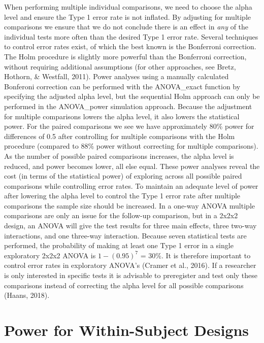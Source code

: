 \documentclass[,man,floatsintext]{apa6}
\begin{document}
When performing multiple individual comparisons, we need to choose the alpha level and ensure the Type 1 error rate is not inflated.
By adjusting for multiple comparisons we ensure that we do not conclude there is an effect in \emph{any} of the individual tests more often than the desired Type 1 error rate.
Several techniques to control error rates exist, of which the best known is the Bonferroni correction.
The Holm procedure is slightly more powerful than the Bonferroni correction, without requiring additional assumptions (for other approaches, see Bretz, Hothorn, \& Westfall, 2011).
Power analyses using a manually calculated Bonferoni correction can be performed with the ANOVA\_exact function by specifying the adjusted alpha level, but the sequential Holm approach can only be performed in the ANOVA\_power simulation approach.
Because the adjustment for multiple comparisons lowers the alpha level, it also lowers the statistical power.
For the paired comparisons we see we have approximately 80\% power for differences of 0.5 after controlling for multiple comparisons with the Holm procedure (compared to 88\% power without correcting for multiple comparisons).
As the number of possible paired comparisons increases, the alpha level is reduced, and power becomes lower, all else equal.
These power analyses reveal the cost (in terms of the statistical power) of exploring across all possible paired comparisons while controlling error rates.
To maintain an adequate level of power after lowering the alpha level to control the Type 1 error rate after multiple comparisons the sample size should be increased.
In a one-way ANOVA multiple comparisons are only an issue for the follow-up comparison, but in a 2x2x2 design, an ANOVA will give the test results for three main effects, three two-way interactions, and one three-way interaction.
Because seven statistical tests are performed, the probability of making at least one Type 1 error in a single exploratory 2x2x2 ANOVA is \(1-(0.95)^7\) = 30\%.
It is therefore important to control error rates in exploratory ANOVA's (Cramer et al., 2016).
If a researcher is only interested in specific tests it is advisable to preregister and test only these comparisons instead of correcting the alpha level for all possible comparisons (Haans, 2018).

\hypertarget{power-for-within-subject-designs}{%
\section{Power for Within-Subject Designs}\label{power-for-within-subject-designs}}
\end{document}
